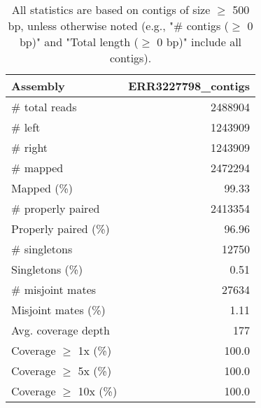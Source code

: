 \documentclass[12pt,a4paper]{article}
\begin{document}
\begin{table}[ht]
\begin{center}
\caption{All statistics are based on contigs of size $\geq$ 500 bp, unless otherwise noted (e.g., "\# contigs ($\geq$ 0 bp)" and "Total length ($\geq$ 0 bp)" include all contigs).}
\begin{tabular}{|l*{1}{|r}|}
\hline
Assembly & ERR3227798\_contigs \\ \hline
\# total reads & 2488904 \\ \hline
\# left & 1243909 \\ \hline
\# right & 1243909 \\ \hline
\# mapped & 2472294 \\ \hline
Mapped (\%) & 99.33 \\ \hline
\# properly paired & 2413354 \\ \hline
Properly paired (\%) & 96.96 \\ \hline
\# singletons & 12750 \\ \hline
Singletons (\%) & 0.51 \\ \hline
\# misjoint mates & 27634 \\ \hline
Misjoint mates (\%) & 1.11 \\ \hline
Avg. coverage depth & 177 \\ \hline
Coverage $\geq$ 1x (\%) & 100.0 \\ \hline
Coverage $\geq$ 5x (\%) & 100.0 \\ \hline
Coverage $\geq$ 10x (\%) & 100.0 \\ \hline
\end{tabular}
\end{center}
\end{table}
\end{document}

